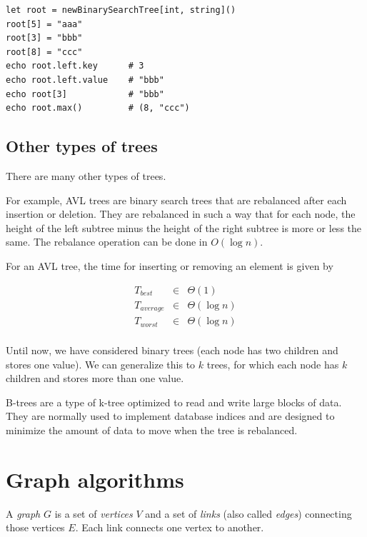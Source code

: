 \documentclass[justified, sixbynine]{tufte-book}
\theoremstyle{plain}%
\newtheorem * {corollary}{Corollary}
\theoremstyle{definition}
\theoremstyle{remark}
\newtheorem * {remark}{Remark}
\newtheorem * {note}{Note}
\begin{document}
\begin{fullwidth}
\begin{lstlisting}
let root = newBinarySearchTree[int, string]()
root[5] = "aaa"
root[3] = "bbb"
root[8] = "ccc"
echo root.left.key      # 3
echo root.left.value    # "bbb"
echo root[3]            # "bbb"
echo root.max()         # (8, "ccc")
\end{lstlisting}

\goodbreak\subsection{Other types of trees}

There are many other types of trees. 

For example, AVL trees are binary search trees that are rebalanced after each
insertion or deletion. They are rebalanced in such a way that for each node, the
height of the left subtree minus the height of the right subtree is more or less the same. The rebalance operation can be done in $O(\log n)$.

For an AVL tree, the time for inserting or removing an element is given by

\begin{eqnarray}
T_{best} &\in &\Theta (1) \\
T_{average} &\in &\Theta (\log n) \\
T_{worst} &\in &\Theta (\log n) \\
\end{eqnarray}


Until now, we have considered binary trees (each node has two children and
stores one value). We can generalize this to $k$ trees, for which each node has $k$
children and stores more than one value.

B-trees are a type of k-tree optimized to read and write large blocks of data. They are normally used to implement database indices and are designed to minimize the amount of data to move when the tree is rebalanced.

\goodbreak\section{Graph algorithms}


A {\it graph} $G$ is a set of {\it vertices} $V$ and a set of {\it links} (also called {\it edges}) connecting those vertices $E$. Each link connects one vertex to another.


\end{fullwidth}
\end{document}
